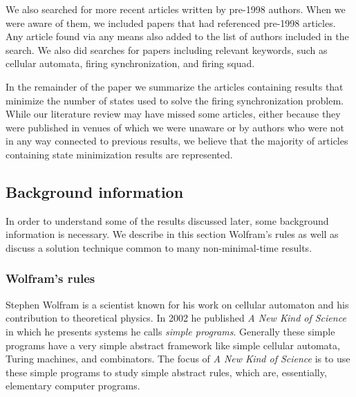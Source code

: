 \documentclass{article}
\begin{document}
We also searched for more recent articles written by pre-1998 authors. When we were aware of them, we included papers that had referenced pre-1998 articles. Any article found via any means also added to the list of authors included in the search. We also did searches for papers including relevant keywords, such as cellular automata, firing synchronization, and firing squad.

In the remainder of the paper we summarize the articles containing results that minimize the number of states used to solve the firing synchronization problem. While our literature review may have missed some articles, either because they were published in venues of which we were unaware or by authors who were not in any way connected to previous results, we believe that the majority of articles containing state minimization results are represented.

\subsection{Background information}
In order to understand some of the results discussed later, some background information is necessary. We describe in this section Wolfram's rules as well as discuss a solution technique common to many non-minimal-time results.

\subsubsection{Wolfram's rules}\label{sec:wolfram}
Stephen Wolfram is a scientist known for his work on cellular automaton and his contribution to theoretical physics. In 2002 he published \emph{A New Kind of Science}\cite{Wolfram2002} in which he presents systems he calls \emph{simple programs}. Generally these simple programs have a very simple abstract framework like simple cellular automata, Turing machines, and combinators. The focus of \emph{A New Kind of Science} is to use these simple programs to study simple abstract rules, which are, essentially, elementary computer programs.
\end{document}
